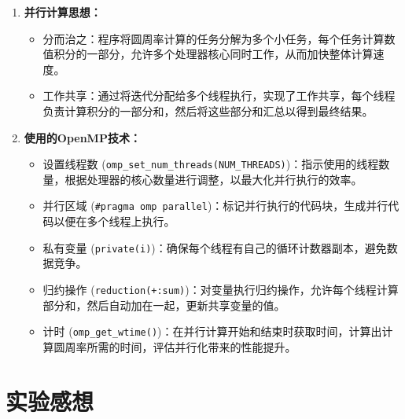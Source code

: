 \documentclass{article}
\begin{document}
\begin{enumerate}
    \item \textbf{并行计算思想：}
    \begin{itemize}
        \item 分而治之：程序将圆周率计算的任务分解为多个小任务，每个任务计算数值积分的一部分，允许多个处理器核心同时工作，从而加快整体计算速度。
        \item 工作共享：通过将迭代分配给多个线程执行，实现了工作共享，每个线程负责计算积分的一部分和，然后将这些部分和汇总以得到最终结果。
    \end{itemize}
    
    \item \textbf{使用的OpenMP技术：}
    \begin{itemize}
        \item 设置线程数 (\texttt{omp\_set\_num\_threads(NUM\_THREADS)})：指示使用的线程数量，根据处理器的核心数量进行调整，以最大化并行执行的效率。
        \item 并行区域 (\texttt{\#pragma omp parallel})：标记并行执行的代码块，生成并行代码以便在多个线程上执行。
        \item 私有变量 (\texttt{private(i)})：确保每个线程有自己的循环计数器副本，避免数据竞争。
        \item 归约操作 (\texttt{reduction(+:sum)})：对变量执行归约操作，允许每个线程计算部分和，然后自动加在一起，更新共享变量的值。
        \item 计时 (\texttt{omp\_get\_wtime()})：在并行计算开始和结束时获取时间，计算出计算圆周率所需的时间，评估并行化带来的性能提升。
    \end{itemize}
\end{enumerate}

\subsection{}
\section{实验感想}
\newpage
\appendix
\end{document}
